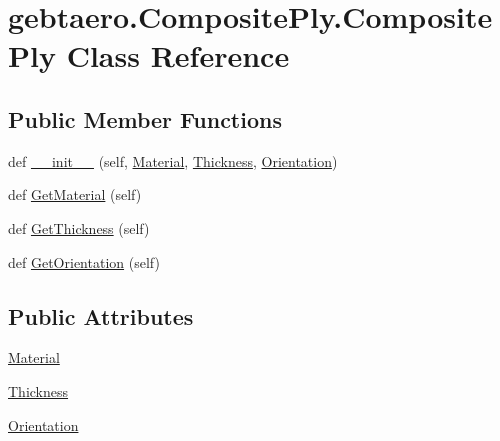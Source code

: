 \hypertarget{classgebtaero_1_1_composite_ply_1_1_composite_ply}{}\section{gebtaero.\+Composite\+Ply.\+Composite\+Ply Class Reference}
\label{classgebtaero_1_1_composite_ply_1_1_composite_ply}
\subsection*{Public Member Functions}
\begin{DoxyCompactItemize}
\item 
def \hyperlink{classgebtaero_1_1_composite_ply_1_1_composite_ply_a1165011eca12a4b958aee5cfda595258}{\+\_\+\+\_\+init\+\_\+\+\_\+} (self, \hyperlink{classgebtaero_1_1_composite_ply_1_1_composite_ply_a5ec1ca6af4be2e10bab777f29f469e3e}{Material}, \hyperlink{classgebtaero_1_1_composite_ply_1_1_composite_ply_a0356871876ebf481a0d252f6db1171da}{Thickness}, \hyperlink{classgebtaero_1_1_composite_ply_1_1_composite_ply_a17a90c6f267e88387ac5c06a3dad1cc7}{Orientation})
\item 
def \hyperlink{classgebtaero_1_1_composite_ply_1_1_composite_ply_ae6cc2be5f3b6f81d239215f92db1e410}{Get\+Material} (self)
\item 
def \hyperlink{classgebtaero_1_1_composite_ply_1_1_composite_ply_a87b7989f6e41a5c97d6401d429002731}{Get\+Thickness} (self)
\item 
def \hyperlink{classgebtaero_1_1_composite_ply_1_1_composite_ply_ae60dbb9255f4aac7c6b455ea0f4ea282}{Get\+Orientation} (self)
\end{DoxyCompactItemize}
\subsection*{Public Attributes}
\begin{DoxyCompactItemize}
\item 
\hyperlink{classgebtaero_1_1_composite_ply_1_1_composite_ply_a5ec1ca6af4be2e10bab777f29f469e3e}{Material}
\item 
\hyperlink{classgebtaero_1_1_composite_ply_1_1_composite_ply_a0356871876ebf481a0d252f6db1171da}{Thickness}
\item 
\hyperlink{classgebtaero_1_1_composite_ply_1_1_composite_ply_a17a90c6f267e88387ac5c06a3dad1cc7}{Orientation}
\end{DoxyCompactItemize}


